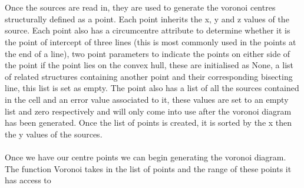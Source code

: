 \\
\\
Once the sources are read in, they are used to generate the voronoi centres structurally defined as a point. Each point inherits the x, y and z values of the source. Each point also has a circumcentre attribute to determine whether it is the point of intercept of three lines (this is most commonly used in the points at the end of a line), two point parameters to indicate the points on either side of the point if the point lies on the convex hull, these are initialised as None, a list of related structures containing another point and their corresponding bisecting line, this list is set as empty. The point also has a list of all the sources contained in the cell and an error value associated to it, these values are set to an empty list and zero respectively and will only come into use after the voronoi diagram has been generated. Once the list of points is created, it is sorted by the x then the y values of the sources.
\\
\\
Once we have our centre points we can begin generating the voronoi diagram. The function Voronoi takes in the list of points and the range of these points it has access to